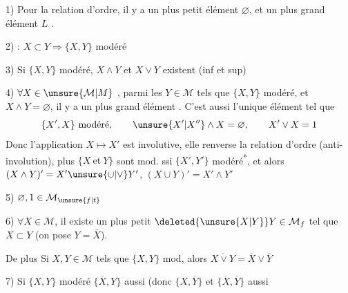 
1) Pour la relation d'ordre, il y a un plus petit élément $\varnothing$, et un plus grand élément $L$ .

2) : $X\subset Y\Rightarrow\{X,Y\}$ modéré

3) Si $\{X,Y\}$ modéré, $X\wedge Y$ et $X\vee Y$ existent (inf et sup)

  

4)  $\forall X\in\unsure{\mathcal M|M}$ ,  parmi les $Y\in\mathcal M$ tels que $\{X,Y\}$ modéré, et $X\wedge Y=\varnothing$, il y a un plus grand élément . C'est aussi l'unique élément tel que
\[
\{X',X\}\text{ modéré},\qquad \unsure{X'|X''}\wedge X=\varnothing,\qquad X'\vee X=1
\]
Donc l'application $X\mapsto X'$ est involutive, elle renverse la relation d'ordre (anti-involution),   plus $\{X\ \mathrm{et}\ Y\}$ sont mod. ssi $\{X',Y'\}$ modéré\textsuperscript{*},
et alors \quad $(X\wedge Y)'=X'\unsure{\cup|\vee}Y'$, \quad $(X\cup Y)'=X'\wedge Y'$

5) $\varnothing,1\in\mathcal M_{\unsure{f|t}}$

6) $\forall X\in\mathcal M$, il existe un plus petit $\deleted{\unsure{X|Y}}Y\in\mathcal M_f$ tel que $X\subset Y$ (on pose $Y=\bar X$).

De plus Si $X,Y\in\mathcal M$ tels que $\{X,Y\}$ mod, alors $\overline{X\vee Y}=\overline X\vee\overline Y$

7) Si $\{X,Y\}$ modéré $\{\overline X,Y\}$ aussi (donc $\{X,\overline Y\}$ et $\{\overline X,\overline Y\}$ aussi

